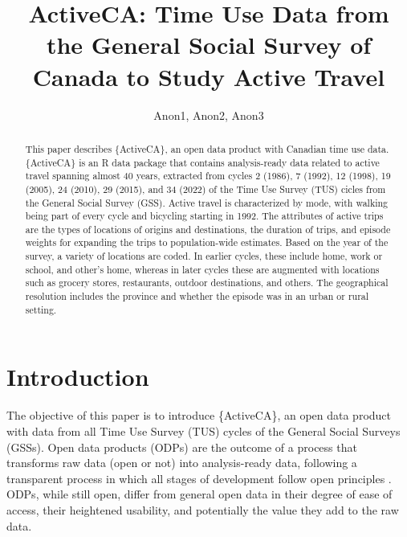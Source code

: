 \documentclass[Royal,times,sageh]{sagej}
\begin{document}

\title{ActiveCA: Time Use Data from the General Social Survey of Canada
to Study Active Travel}

\runninghead{}

\author{Anon1\affilnum{}, Anon2\affilnum{}, Anon3\affilnum{}}

\affiliation{\affilnum{}{}}



\begin{abstract}
This paper describes \{ActiveCA\}, an open data product with Canadian
time use data. \{ActiveCA\} is an R data package that contains
analysis-ready data related to active travel spanning almost 40 years,
extracted from cycles 2 (1986), 7 (1992), 12 (1998), 19 (2005), 24
(2010), 29 (2015), and 34 (2022) of the Time Use Survey (TUS) cicles
from the General Social Survey (GSS). Active travel is characterized by
mode, with walking being part of every cycle and bicycling starting in
1992. The attributes of active trips are the types of locations of
origins and destinations, the duration of trips, and episode weights for
expanding the trips to population-wide estimates. Based on the year of
the survey, a variety of locations are coded. In earlier cycles, these
include home, work or school, and other's home, whereas in later cycles
these are augmented with locations such as grocery stores, restaurants,
outdoor destinations, and others. The geographical resolution includes
the province and whether the episode was in an urban or rural setting.
\end{abstract}


\maketitle

\section{Introduction}\label{introduction}

The objective of this paper is to introduce \{ActiveCA\}, an open data
product with data from all Time Use Survey (TUS) cycles of the General
Social Surveys (GSSs). Open data products (ODPs) are the outcome of a
process that transforms raw data (open or not) into analysis-ready data,
following a transparent process in which all stages of development
follow open principles \citep{arribas-bel2021}. ODPs, while still open,
differ from general open data in their degree of ease of access, their
heightened usability, and potentially the value they add to the raw
data.
\end{document}

